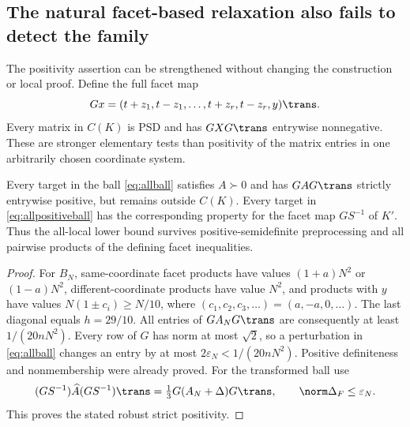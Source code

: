 \subsection{The natural facet-based relaxation also fails to detect the family}
The positivity assertion can be strengthened without changing the construction or local proof. Define the full facet map
\[
 Gx=(t+z_1,t-z_1,\ldots,t+z_r,t-z_r,y)\trans.
\]
Every matrix in $C(K)$ is PSD and has $GXG\trans$ entrywise nonnegative. These are stronger elementary tests than positivity of the matrix entries in one arbitrarily chosen coordinate system.

\begin{corollary}\label{cor:facetrelaxation}
Every target in the ball \eqref{eq:allball} satisfies $A\succ0$ and has $GAG\trans$ strictly entrywise positive, but remains outside $C(K)$. Every target in \eqref{eq:allpositiveball} has the corresponding property for the facet map $GS^{-1}$ of $K'$. Thus the all-local lower bound survives positive-semidefinite preprocessing and all pairwise products of the defining facet inequalities.
\end{corollary}
\begin{proof}
For $B_N$, same-coordinate facet products have values $(1+a)N^2$ or $(1-a)N^2$, different-coordinate products have value $N^2$, and products with $y$ have values $N(1\pm c_i)\ge N/10$, where $(c_1,c_2,c_3,\ldots)=(a,-a,0,\ldots)$. The last diagonal equals $h=29/10$. All entries of $GA_NG\trans$ are consequently at least $1/(20nN^2)$. Every row of $G$ has norm at most $\sqrt2$, so a perturbation in \eqref{eq:allball} changes an entry by at most $2\varepsilon_N<1/(20nN^2)$. Positive definiteness and nonmembership were already proved. For the transformed ball use
\[
 (GS^{-1})\widehat A(GS^{-1})\trans=\tfrac13G(A_N+\Delta)G\trans,
 \qquad\norm\Delta_F\le\varepsilon_N.
\]
This proves the stated robust strict positivity.
\end{proof}

